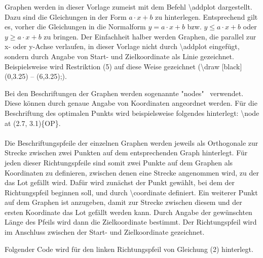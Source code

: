 	Graphen werden in dieser Vorlage zumeist mit dem Befehl \textbackslash addplot dargestellt. Dazu sind die Gleichungen in der Form $a\cdot x + b $ zu hinterlegen. Entsprechend gilt es, vorher die Gleichungen in die Normalform \quad $y = a \cdot x + b$ \quad bzw. \quad $y \leq a \cdot x + b$ \quad oder \quad $y \geq a \cdot x + b$ \quad zu bringen. Der Einfachheit halber werden Graphen, die parallel zur x- oder y-Achse verlaufen, in dieser Vorlage nicht durch \textbackslash addplot eingefügt, sondern durch Angabe von Start- und Zielkoordinate als Linie gezeichnet. Beispielsweise wird Restriktion (5) auf diese Weise gezeichnet (\textbackslash draw [black] (0,3.25) -- (6,3.25);).
	
	Bei den Beschriftungen der Graphen werden sogenannte "nodes" \ verwendet. Diese können durch genaue Angabe von Koordinaten angeordnet werden. Für die Beschriftung des optimalen Punkts wird beispielsweise folgendes hinterlegt:  \textbackslash node at (2.7, 3.1)\{OP\}.\\ \\
	Die Beschriftungspfeile der einzelnen Graphen werden jeweils als Orthogonale zur Strecke zwischen zwei Punkten auf dem entsprechenden Graph hinterlegt. Für jeden dieser Richtungspfeile sind somit zwei Punkte auf dem Graphen als Koordinaten zu definieren, zwischen denen eine Strecke angenommen wird, zu der das Lot gefällt wird. Dafür wird zunächst der Punkt gewählt, bei dem der Richtungspfeil beginnen soll, und durch \textbackslash coordinate definiert. Ein weiterer Punkt auf dem Graphen ist anzugeben, damit zur Strecke zwischen diesem und der ersten Koordinate das Lot gefällt werden kann. Durch Angabe der gewünschten Länge des Pfeils wird dann die Zielkoordinate bestimmt. Der Richtungspfeil wird im Anschluss zwischen der Start- und Zielkoordinate gezeichnet.
	
	Folgender Code wird für den linken Richtungspfeil von Gleichung (2) hinterlegt. \\
	
